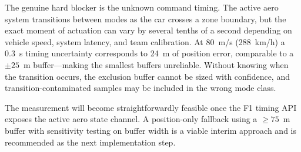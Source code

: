 The genuine hard blocker is the unknown command timing. The active aero system transitions between modes as the car crosses a zone boundary, but the exact moment of actuation can vary by several tenths of a second depending on vehicle speed, system latency, and team calibration. At 80~m/s (288~km/h) a 0.3~s timing uncertainty corresponds to 24~m of position error, comparable to a $\pm 25$~m buffer---making the smallest buffers unreliable. Without knowing when the transition occurs, the exclusion buffer cannot be sized with confidence, and transition-contaminated samples may be included in the wrong mode class.

The measurement will become straightforwardly feasible once the F1 timing API exposes the active aero state channel. A position-only fallback using a $\geq\!75$~m buffer with sensitivity testing on buffer width is a viable interim approach and is recommended as the next implementation step.
